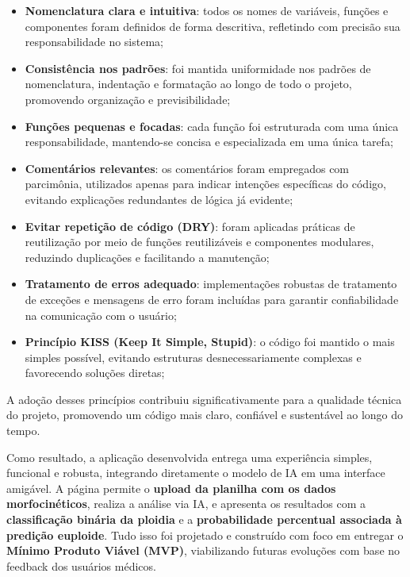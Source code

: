 \begin{itemize}
    \item \textbf{Nomenclatura clara e intuitiva}: todos os nomes de variáveis, funções e componentes foram definidos de forma descritiva, refletindo com precisão sua responsabilidade no sistema;

    \item \textbf{Consistência nos padrões}: foi mantida uniformidade nos padrões de nomenclatura, indentação e formatação ao longo de todo o projeto, promovendo organização e previsibilidade;

    \item \textbf{Funções pequenas e focadas}: cada função foi estruturada com uma única responsabilidade, mantendo-se concisa e especializada em uma única tarefa;

    \item \textbf{Comentários relevantes}: os comentários foram empregados com parcimônia, utilizados apenas para indicar intenções específicas do código, evitando explicações redundantes de lógica já evidente;

    \item \textbf{Evitar repetição de código (DRY)}: foram aplicadas práticas de reutilização por meio de funções reutilizáveis e componentes modulares, reduzindo duplicações e facilitando a manutenção;

    \item \textbf{Tratamento de erros adequado}: implementações robustas de tratamento de exceções e mensagens de erro foram incluídas para garantir confiabilidade na comunicação com o usuário;

    \item \textbf{Princípio KISS (Keep It Simple, Stupid)}: o código foi mantido o mais simples possível, evitando estruturas desnecessariamente complexas e favorecendo soluções diretas;
\end{itemize}

A adoção desses princípios contribuiu significativamente para a qualidade técnica do projeto, promovendo um código mais claro, confiável e sustentável ao longo do tempo.

Como resultado, a aplicação desenvolvida entrega uma experiência simples, funcional e robusta, integrando diretamente o modelo de IA em uma interface amigável. A página permite o \textbf{upload da planilha com os dados morfocinéticos}, realiza a análise via IA, e apresenta os resultados com a \textbf{classificação binária da ploidia} e a \textbf{probabilidade percentual associada à predição euploide}. Tudo isso foi projetado e construído com foco em entregar o \textbf{Mínimo Produto Viável (MVP)}, viabilizando futuras evoluções com base no feedback dos usuários médicos.

